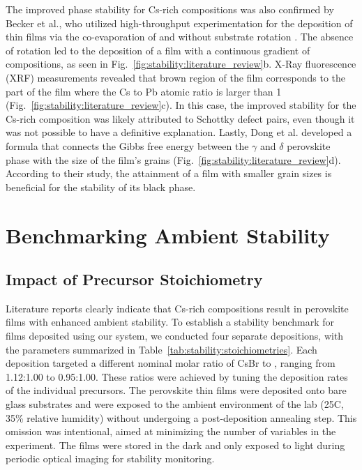  The improved phase stability for Cs-rich compositions was also confirmed by Becker et al., who utilized high-throughput experimentation for the deposition of  thin films via the co-evaporation of  and  without substrate rotation \cite{Becker2019LowExperimentation}. The absence of rotation led to the deposition of a film with a continuous gradient of compositions, as seen in Fig.~\ref{fig:stability:literature_review}b. X-Ray fluorescence (XRF) measurements revealed that brown region of the film corresponds to the part of the film where the Cs to Pb atomic ratio is larger than 1 (Fig.~\ref{fig:stability:literature_review}c). In this case, the improved stability for the Cs-rich composition was likely attributed to Schottky defect pairs, even though it was not possible to have a definitive explanation. Lastly, Dong et al. developed a formula that connects the Gibbs free energy between the $\gamma$ and $\delta$ perovskite phase with the size of the film's grains (Fig.~\ref{fig:stability:literature_review}d). According to their study, the attainment of a film with smaller grain sizes is beneficial for the stability of its black phase.  

 

\section{Benchmarking Ambient Stability}

\subsection{Impact of Precursor Stoichiometry}

Literature reports clearly indicate that Cs-rich compositions result in perovskite films with enhanced ambient stability. To establish a stability benchmark for films deposited using our system, we conducted four separate depositions, with the parameters summarized in Table~\ref{tab:stability:stoichiometries}. Each deposition targeted a different nominal molar ratio of CsBr to , ranging from 1.12:1.00 to 0.95:1.00. These ratios were achieved by tuning the deposition rates of the individual precursors. The perovskite thin films were deposited onto bare glass substrates and were exposed to the ambient environment of the lab (25\degree C, 35\% relative humidity) without undergoing a post-deposition annealing step. This omission was intentional, aimed at minimizing the number of variables in the experiment. The films were stored in the dark and only exposed to light during periodic optical imaging for stability monitoring.


